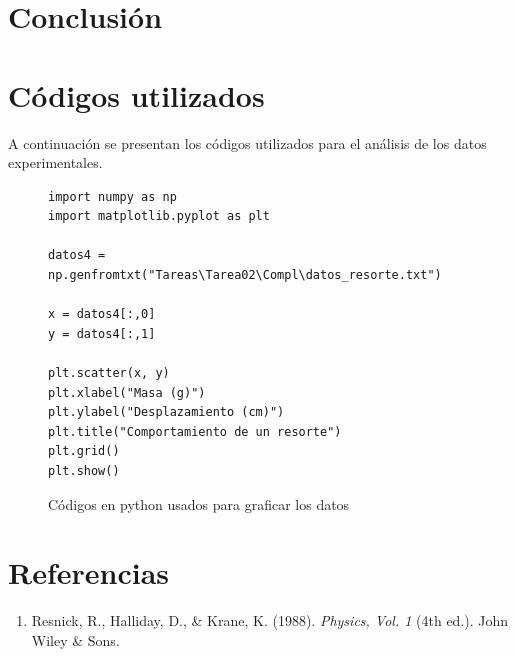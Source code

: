 \documentclass{article}
\begin{document}
\begin{multicols}{2}
    

\section{Conclusión}



\section{Códigos utilizados}
    A continuación se presentan los códigos utilizados para el análisis de los datos experimentales.

\begin{figure}[H]
        \begin{center}
        \begin{adjustbox}{max width=1.5\linewidth}
        \begin{lstlisting}
import numpy as np
import matplotlib.pyplot as plt

datos4 = np.genfromtxt("Tareas\Tarea02\Compl\datos_resorte.txt")

x = datos4[:,0]
y = datos4[:,1]

plt.scatter(x, y)
plt.xlabel("Masa (g)")
plt.ylabel("Desplazamiento (cm)")
plt.title("Comportamiento de un resorte")
plt.grid()
plt.show()
        \end{lstlisting}
        \end{adjustbox}
        \end{center}
    \caption{Códigos en python usados para graficar los datos}
    \label{fig:resorte}
    \end{figure}

\section{Referencias}
    \begin{enumerate}
    
        \item \label{1} Resnick, R., Halliday, D., \& Krane, K. (1988). 
        \textit{Physics, Vol. 1} (4th ed.). John Wiley \& Sons. 
    
    \end{enumerate}
\end{multicols}
\end{document}
